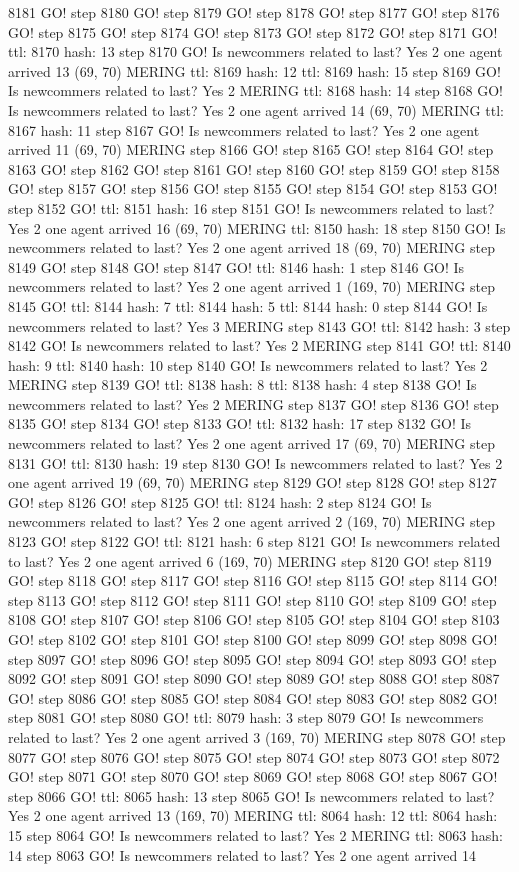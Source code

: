 8181 GO! step 8180 GO! step 8179 GO! step 8178 GO! step 8177 GO! step 8176 GO! step 8175 GO! step 8174 GO! step 8173 GO! step 8172 GO! step 8171 GO! ttl: 8170 hash: 13 step 8170 GO! Is newcommers related to last? Yes 2 one agent arrived 13 (69, 70) MERING ttl: 8169 hash: 12 ttl: 8169 hash: 15 step 8169 GO! Is newcommers related to last? Yes 2 MERING ttl: 8168 hash: 14 step 8168 GO! Is newcommers related to last? Yes 2 one agent arrived 14 (69, 70) MERING ttl: 8167 hash: 11 step 8167 GO! Is newcommers related to last? Yes 2 one agent arrived 11 (69, 70) MERING step 8166 GO! step 8165 GO! step 8164 GO! step 8163 GO! step 8162 GO! step 8161 GO! step 8160 GO! step 8159 GO! step 8158 GO! step 8157 GO! step 8156 GO! step 8155 GO! step 8154 GO! step 8153 GO! step 8152 GO! ttl: 8151 hash: 16 step 8151 GO! Is newcommers related to last? Yes 2 one agent arrived 16 (69, 70) MERING ttl: 8150 hash: 18 step 8150 GO! Is newcommers related to last? Yes 2 one agent arrived 18 (69, 70) MERING step 8149 GO! step 8148 GO! step 8147 GO! ttl: 8146 hash: 1 step 8146 GO! Is newcommers related to last? Yes 2 one agent arrived 1 (169, 70) MERING step 8145 GO! ttl: 8144 hash: 7 ttl: 8144 hash: 5 ttl: 8144 hash: 0 step 8144 GO! Is newcommers related to last? Yes 3 MERING step 8143 GO! ttl: 8142 hash: 3 step 8142 GO! Is newcommers related to last? Yes 2 MERING step 8141 GO! ttl: 8140 hash: 9 ttl: 8140 hash: 10 step 8140 GO! Is newcommers related to last? Yes 2 MERING step 8139 GO! ttl: 8138 hash: 8 ttl: 8138 hash: 4 step 8138 GO! Is newcommers related to last? Yes 2 MERING step 8137 GO! step 8136 GO! step 8135 GO! step 8134 GO! step 8133 GO! ttl: 8132 hash: 17 step 8132 GO! Is newcommers related to last? Yes 2 one agent arrived 17 (69, 70) MERING step 8131 GO! ttl: 8130 hash: 19 step 8130 GO! Is newcommers related to last? Yes 2 one agent arrived 19 (69, 70) MERING step 8129 GO! step 8128 GO! step 8127 GO! step 8126 GO! step 8125 GO! ttl: 8124 hash: 2 step 8124 GO! Is newcommers related to last? Yes 2 one agent arrived 2 (169, 70) MERING step 8123 GO! step 8122 GO! ttl: 8121 hash: 6 step 8121 GO! Is newcommers related to last? Yes 2 one agent arrived 6 (169, 70) MERING step 8120 GO! step 8119 GO! step 8118 GO! step 8117 GO! step 8116 GO! step 8115 GO! step 8114 GO! step 8113 GO! step 8112 GO! step 8111 GO! step 8110 GO! step 8109 GO! step 8108 GO! step 8107 GO! step 8106 GO! step 8105 GO! step 8104 GO! step 8103 GO! step 8102 GO! step 8101 GO! step 8100 GO! step 8099 GO! step 8098 GO! step 8097 GO! step 8096 GO! step 8095 GO! step 8094 GO! step 8093 GO! step 8092 GO! step 8091 GO! step 8090 GO! step 8089 GO! step 8088 GO! step 8087 GO! step 8086 GO! step 8085 GO! step 8084 GO! step 8083 GO! step 8082 GO! step 8081 GO! step 8080 GO! ttl: 8079 hash: 3 step 8079 GO! Is newcommers related to last? Yes 2 one agent arrived 3 (169, 70) MERING step 8078 GO! step 8077 GO! step 8076 GO! step 8075 GO! step 8074 GO! step 8073 GO! step 8072 GO! step 8071 GO! step 8070 GO! step 8069 GO! step 8068 GO! step 8067 GO! step 8066 GO! ttl: 8065 hash: 13 step 8065 GO! Is newcommers related to last? Yes 2 one agent arrived 13 (169, 70) MERING ttl: 8064 hash: 12 ttl: 8064 hash: 15 step 8064 GO! Is newcommers related to last? Yes 2 MERING ttl: 8063 hash: 14 step 8063 GO! Is newcommers related to last? Yes 2 one agent arrived 14 